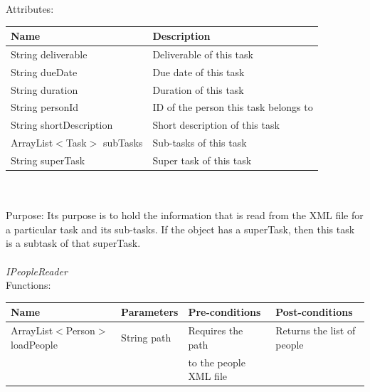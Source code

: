 Attributes:\\
\begin{tabular}{| l | l |}
\hline
 Name                                     	 	& Description\\
\hline
String deliverable			& Deliverable of this task\\
\hline
String dueDate			& Due date of this task\\
\hline
String duration		 		& Duration of this task\\
\hline
String personId			& ID of the person this task belongs to\\
\hline
String shortDescription		& Short description of this task\\
\hline
ArrayList$<$Task$>$ subTasks	& Sub-tasks of this task\\
\hline
String superTask			& Super task of this task\\
\hline
\end{tabular}\\
\\

Purpose: Its purpose is to hold the information that is read from the XML file for a particular task and its sub-tasks. If the object has a superTask, then this task is a subtask of that superTask.
\\
\\

\emph{IPeopleReader}\\
Functions:\\
\begin{tabular}{| l | l | l | l |}
\hline
Name & Parameters & Pre-conditions & Post-conditions\\
\hline
		ArrayList$<$Person$>$loadPeople 	& String path       			& Requires the path 	& Returns the list of people\\
                                                                                    &                         			 & to the people XML file	& 
\\
\hline
\end{tabular}
\\

